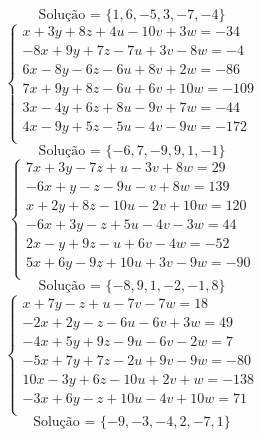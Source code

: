 \documentclass[12pt,oneside,a4paper]{article}
\begin{document}
\begin{equation*}
\text{Solução = }\{1,6,-5,3,-7,-4\}
\end{equation*}
\vspace{\baselineskip}
\begin{equation*}
\begin{cases}
x+3y+8z+4u-10v+3w=-34 \\
-8x+9y+7z-7u+3v-8w=-4 \\
6x-8y-6z-6u+8v+2w=-86 \\
7x+9y+8z-6u+6v+10w=-109 \\
3x-4y+6z+8u-9v+7w=-44 \\
4x-9y+5z-5u-4v-9w=-172 \\
\end{cases}
\end{equation*}
\begin{equation*}
\text{Solução = }\{-6,7,-9,9,1,-1\}
\end{equation*}
\vspace{\baselineskip}
\begin{equation*}
\begin{cases}
7x+3y-7z+u-3v+8w=29 \\
-6x+y-z-9u-v+8w=139 \\
x+2y+8z-10u-2v+10w=120 \\
-6x+3y-z+5u-4v-3w=44 \\
2x-y+9z-u+6v-4w=-52 \\
5x+6y-9z+10u+3v-9w=-90 \\
\end{cases}
\end{equation*}
\begin{equation*}
\text{Solução = }\{-8,9,1,-2,-1,8\}
\end{equation*}
\vspace{\baselineskip}
\begin{equation*}
\begin{cases}
x+7y-z+u-7v-7w=18 \\
-2x+2y-z-6u-6v+3w=49 \\
-4x+5y+9z-9u-6v-2w=7 \\
-5x+7y+7z-2u+9v-9w=-80 \\
10x-3y+6z-10u+2v+w=-138 \\
-3x+6y-z+10u-4v+10w=71 \\
\end{cases}
\end{equation*}
\begin{equation*}
\text{Solução = }\{-9,-3,-4,2,-7,1\}
\end{equation*}
\end{document}
